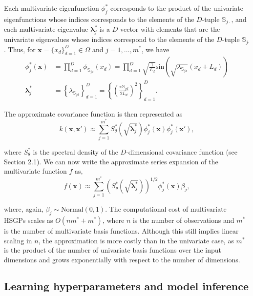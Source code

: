 \documentclass[]{interact}
\theoremstyle{plain}%
\theoremstyle{definition}
\theoremstyle{remark}
\begin{document}
Each multivariate eigenfunction $\phi^{\ast}_j$ corresponds to the product of the univariate eigenfunctions whose indices corresponds to the elements of the $D$-tuple $\mathbb{S}_{j\cdotp}$, and each multivariate eigenvalue $\bm{\lambda}^{\ast}_j$ is a $D$-vector with elements that are the univariate eigenvalues whose indices correspond to the elements of the $D$-tuple $\mathbb{S}_{j\bm{\cdotp}}$. Thus, for $\bm{x}=\{x_d\}_{d=1}^D \in \Omega$ and $j=1,\ldots,m^{\ast}$, we have 
%
\begin{align}
\phi^{\ast}_j(\bm{x}) &= \prod_{d=1}^{D} \phi_{\mathbb{S}_{jd}}(x_d) = \prod_{d=1}^{D} \sqrt{\frac{1}{L_d}} \text{sin}\left(\sqrt{\lambda_{\mathbb{S}_{jd}}}(x_d+L_d)\right) \label{eigenfunction_multi} \\
%
\bm{\lambda}^{\ast}_j &= \left\{ \lambda_{\mathbb{S}_{jd}} \right\}_{d=1}^D =  \left\{ \left(\tfrac{\pi \mathbb{S}_{jd}}{2L_d}\right)^2 \right\}_{d=1}^D. \label{eigenvalue_multi}
\end{align}

\noindent The approximate covariance function is then represented as
%
\begin{equation}\label{approxcov_multi}
k(\bm{x},\bm{x}') \approx \sum_{j=1}^{m^{\ast}} 
S^{\ast}_{\theta}\left(\sqrt{\bm{\lambda}^{\ast}_j}\right)
\phi^{\ast}_j(\bm{x}) \phi^{\ast}_j(\bm{x}'),
\end{equation}

\noindent where $S^{\ast}_{\theta}$ is the spectral density of the $D$-dimensional covariance function (see Section 2.1). We can now write the approximate series expansion of the multivariate function $f$ as,
%
\begin{equation}\label{approxf_multi}
f(\bm{x}) \approx \sum_{j=1}^{m^{\ast}} 
\left( S^{\ast}_{\theta} \left(\sqrt{\bm{\lambda}^{\ast}_j} \right)\right)^{1/2}
\phi^{\ast}_j(\bm{x}) \beta_j, 
\end{equation}

\noindent where, again, $\beta_j \sim \text{Normal}(0,1)$. The computational cost of multivariate HSGPs scales as $O(n m^{\ast} + m^{\ast})$, where $n$ is the number of observations and $m^{\ast}$ is the number of multivariate basis functions. Although this still implies linear scaling in $n$, the approximation is more costly than in the univariate case, as $m^{\ast}$ is the product of the number of univariate basis functions over the input dimensions and grows exponentially with respect to the number of  dimensions.

\subsection{Learning hyperparameters and model inference}
\end{document}
